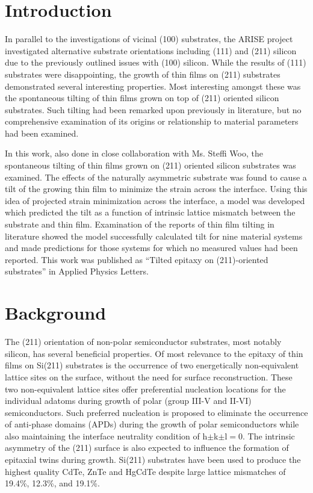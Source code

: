 \section{Introduction}\label{sec:211}
In parallel to the investigations of vicinal (100) substrates, the ARISE project investigated alternative substrate orientations including (111) and (211) silicon due to the previously outlined issues with (100) silicon.
While the results of (111) substrates were disappointing, the growth of thin films on (211) substrates demonstrated several interesting properties.
Most interesting amongst these was the spontaneous tilting of thin films grown on top of (211) oriented silicon substrates.
Such tilting had been remarked upon previously in literature, but no comprehensive examination of its origins or relationship to material parameters had been examined.

In this work, also done in close collaboration with Ms. Steffi Woo, the spontaneous tilting of thin films grown on (211) oriented silicon substrates was examined.
The effects of the naturally asymmetric substrate was found to cause a tilt of the growing thin film to minimize the strain across the interface.
Using this idea of projected strain minimization across the interface, a model was developed which predicted the tilt as a function of intrinsic lattice mismatch between the substrate and thin film.
Examination of the reports of thin film tilting in literature showed the model successfully calculated tilt for nine material systems and made predictions for those systems for which no measured values had been reported.
This work was published as ``Tilted epitaxy on (211)-oriented substrates'' in Applied Physics Letters\cite{Woo2013}.
\section{Background}
The (211) orientation of non-polar semiconductor substrates, most notably silicon, has several beneficial properties.
Of most relevance to the epitaxy of thin films on Si(211) substrates is the occurrence of two energetically non-equivalent lattice sites on the surface, without the need for surface reconstruction\cite{Wright1982}.
These two non-equivalent lattice sites offer preferential nucleation locations for the individual adatoms during growth of polar (group III-V and II-VI) semiconductors.
Such preferred nucleation is proposed to eliminate the occurrence of anti-phase domains (APDs) during the growth of polar semiconductors\cite{Wright1982} while also maintaining the interface neutrality condition of h\(\pm\)k\(\pm\)l\(=\)0\cite{Wright1982}.
The intrinsic asymmetry of the (211) surface is also expected to influence the formation of epitaxial twins during growth\cite{Devenyi2011}.
Si(211) substrates have been used to produce the highest quality CdTe\cite{Zhao2011}, ZnTe\cite{Wang2011a} and HgCdTe\cite{Dhar1997a} despite large lattice mismatches of 19.4\%, 12.3\%, and 19.1\%.

